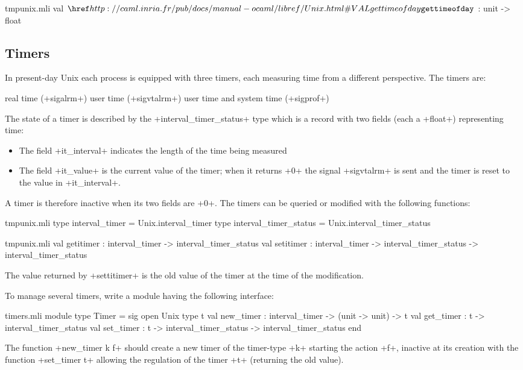 %
\begin{listingcodefile}{tmpunix.mli}
val $\libvalue{Unix}{gettimeofday}$ : unit -> float
\end{listingcodefile}

\subsection*{Timers}
In present-day Unix each process is equipped with three timers, each
measuring time from a different perspective.  The timers are:

%
\begin{mltypecases}
 real time (\ml+sigalrm+)
 user time (\ml+sigvtalrm+)
 user time and system time (\ml+sigprof+)
\end{mltypecases}
% 
The state of a timer is described by the \ml+interval_timer_status+
type which is a record with two fields (each a \ml+float+)
representing time:
%
\begin{itemize}
\item The field \ml+it_interval+ indicates the length of the time 
being measured
\item The field \ml+it_value+ is the current value of the timer; 
when it returns \ml+0+ the signal \ml+sigvtalrm+ is sent and 
the timer is reset to the value in \ml+it_interval+.
\end{itemize}
%
A timer is therefore inactive when its two fields are \ml+0+.  
The timers can be queried or modified with the following functions:
%
\begin{codefile}{tmpunix.mli}
type interval_timer = Unix.interval_timer
type interval_timer_status = Unix.interval_timer_status
\end{codefile}
%
\begin{listingcodefile}{tmpunix.mli}
val getitimer : interval_timer -> interval_timer_status
val setitimer : 
    interval_timer -> interval_timer_status -> interval_timer_status
\end{listingcodefile}
%

The value returned by \ml+settitimer+ is the old value of 
the timer at the time of the modification.

\begin{exercise}[noanswer]

To manage several timers, write a module having the following interface:
%
\begin{listingcodefile}{timers.mli}
module type Timer = sig
  open Unix
  type t
  val new_timer : interval_timer -> (unit -> unit) -> t
  val get_timer : t -> interval_timer_status
  val set_timer : t -> interval_timer_status -> interval_timer_status
end
\end{listingcodefile}
%

The function \ml+new_timer k f+ should create a new timer of the 
timer-type \ml+k+ starting the action \ml+f+, inactive at its creation with 
the function \ml+set_timer t+ allowing the regulation of the timer \ml+t+ 
(returning the old value). 

\end{exercise}

